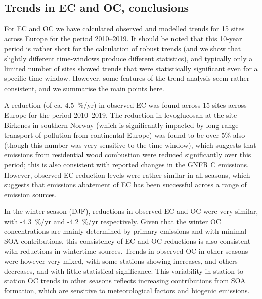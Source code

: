 \subsection{Trends in EC and OC, conclusions}
\label{ss:trendsECOCconc}




For EC and OC we have calculated observed and modelled trends for 15 sites across Europe for the period 2010--2019. It should be noted that this 10-year period is rather short for the calculation of robust trends (and we show that slightly different time-windows produce different statistics), and typically only a limited number of sites showed trends that were statistically significant even for a specific time-window. However, some features of the trend analysis seem rather consistent, and we summarise the main points here. 

A reduction (of ca. 4.5~\%/yr) in observed EC was found across 15 sites across Europe for the  period 
2010--2019. The reduction in levoglucosan at the site Birkenes in southern Norway (which is significantly impacted by long-range transport of pollution from continental Europe) was found to be over 5\% also (though this number was very sensitive to the time-window), which suggests that emissions from residential wood combustion were reduced significantly over this period; this is also consistent with reported changes in the GNFR C emissions. However, observed EC reduction levels were rather similar in all seasons, which suggests that emissions abatement of EC has been successful across a range of emission sources. 

In the winter season (DJF), reductions in observed EC and OC were very similar, with \mbox{-4.3~\%/yr} and -4.2~\%/yr respectively. Given that the winter OC concentrations are mainly determined by primary emissions and with minimal SOA contributions, this consistency of EC and OC reductions is also consistent with reductions in wintertime sources. Trends in observed OC in other seasons were however very mixed, with some stations showing increases, and others decreases, and with little statistical significance. This variability in station-to-station OC trends in other seasons reflects increasing contributions from SOA formation, which are sensitive to meteorological factors and biogenic emissions.

